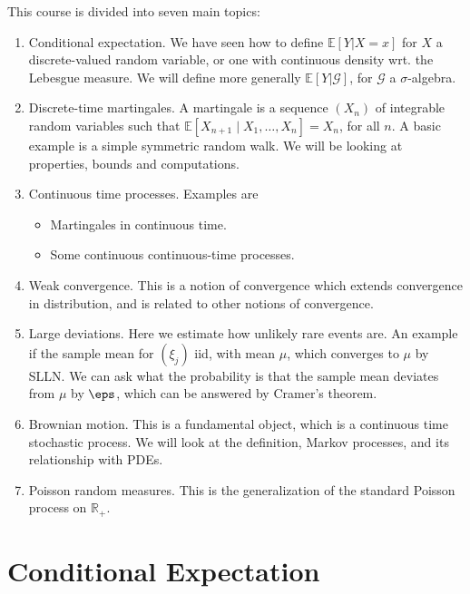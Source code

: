 \documentclass[12pt]{article}
\begin{document}
This course is divided into seven main topics:
\begin{enumerate}[label=Chapter \arabic*.]
	\item Conditional expectation. We have seen how to define $\mathbb{E}[Y | X = x]$ for $X$ a discrete-valued random variable, or one with continuous density wrt. the Lebesgue measure. We will define more generally $\mathbb{E}[Y|\mathcal{G}]$, for $\mathcal{G}$ a $\sigma$-algebra.
	\item Discrete-time martingales. A martingale is a sequence $(X_n)$ of integrable random variables such that $\mathbb{E}[X_{n+1} \mid X_1, \ldots, X_n] = X_n$, for all $n$. A basic example is a simple symmetric random walk. We will be looking at properties, bounds and computations.
	\item Continuous time processes. Examples are
		\begin{itemize}
			\item Martingales in continuous time.
			\item Some continuous continuous-time processes.
		\end{itemize}
	\item Weak convergence. This is a notion of convergence which extends convergence in distribution, and is related to other notions of convergence.
	\item Large deviations. Here we estimate how unlikely rare events are. An example if the sample mean for $(\xi_j)$ iid, with mean $\mu$, which converges to $\mu$ by SLLN. We can ask what the probability is that the sample mean deviates from $\mu$ by $\eps$, which can be answered by Cramer's theorem.
	\item Brownian motion. This is a fundamental object, which is a continuous time stochastic process. We will look at the definition, Markov processes, and its relationship with PDEs.
	\item Poisson random measures. This is the generalization of the standard Poisson process on $\mathbb{R}_+$.
\end{enumerate}

\newpage

\section{Conditional Expectation}%
\label{sec:cond_e}
\end{document}
